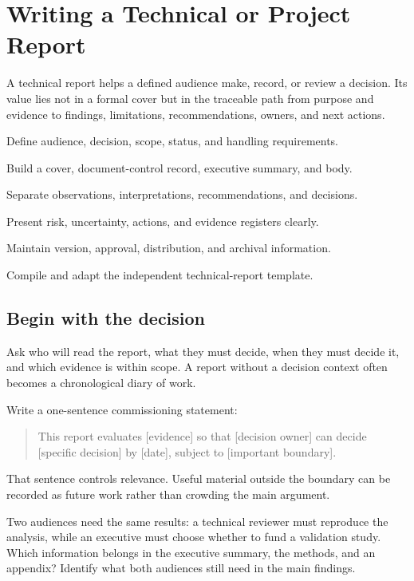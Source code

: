\chapter{Writing a Technical or Project Report}
\label{chap:report}

A technical report helps a defined audience make, record, or review a decision.
Its value lies not in a formal cover but in the traceable path from purpose and
evidence to findings, limitations, recommendations, owners, and next actions.

\begin{learningoutcomes}
  \item Define audience, decision, scope, status, and handling requirements.
  \item Build a cover, document-control record, executive summary, and body.
  \item Separate observations, interpretations, recommendations, and decisions.
  \item Present risk, uncertainty, actions, and evidence registers clearly.
  \item Maintain version, approval, distribution, and archival information.
  \item Compile and adapt the independent technical-report template.
\end{learningoutcomes}

\section{Begin with the decision}

Ask who will read the report, what they must decide, when they must decide it,
and which evidence is within scope. A report without a decision context often
becomes a chronological diary of work.

Write a one-sentence commissioning statement:

\begin{quote}
This report evaluates [evidence] so that [decision owner] can decide [specific
decision] by [date], subject to [important boundary].
\end{quote}

That sentence controls relevance. Useful material outside the boundary can be
recorded as future work rather than crowding the main argument.

\begin{pausepredict}
Two audiences need the same results: a technical reviewer must reproduce the
analysis, while an executive must choose whether to fund a validation study.
Which information belongs in the executive summary, the methods, and an
appendix? Identify what both audiences still need in the main findings.
\end{pausepredict}

